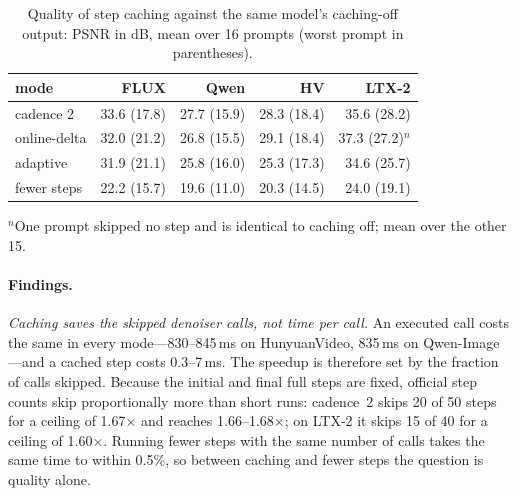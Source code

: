 \begin{table}[t]
\caption{Quality of step caching against the same model's caching-off output: PSNR in dB, mean over 16 prompts (worst prompt in parentheses).}
\label{tab:teacache-quality}
\centering
\footnotesize
\setlength{\tabcolsep}{4pt}
\begin{tabular}{@{}lrrrr@{}}
\toprule
mode & FLUX & Qwen & HV & LTX-2 \\
\midrule
cadence 2        & 33.6 (17.8) & 27.7 (15.9) & 28.3 (18.4) & 35.6 (28.2) \\
online-delta     & 32.0 (21.2) & 26.8 (15.5) & 29.1 (18.4) & 37.3 (27.2)$^{n}$ \\
adaptive         & 31.9 (21.1) & 25.8 (16.0) & 25.3 (17.3) & 34.6 (25.7) \\
fewer steps      & 22.2 (15.7) & 19.6 (11.0) & 20.3 (14.5) & 24.0 (19.1) \\
\bottomrule
\end{tabular}
\par\smallskip
{\raggedright\scriptsize $^{n}$One prompt skipped no step and is identical to caching off; mean over the other 15.\par}
\vskip -0.1in
\end{table}

\paragraph{Findings.}
\emph{Caching saves the skipped denoiser calls, not time per call.} An executed call costs the same in every mode---830--845\,ms on HunyuanVideo, 835\,ms on Qwen-Image---and a cached step costs 0.3--7\,ms. The speedup is therefore set by the fraction of calls skipped. Because the initial and final full steps are fixed, official step counts skip proportionally more than short runs: cadence~2 skips 20 of 50 steps for a ceiling of 1.67$\times$ and reaches 1.66--1.68$\times$; on LTX-2 it skips 15 of 40 for a ceiling of 1.60$\times$. Running fewer steps with the same number of calls takes the same time to within 0.5\%, so between caching and fewer steps the question is quality alone.

